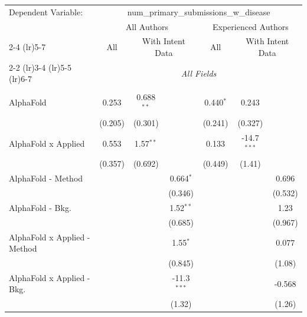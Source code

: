 \begingroup
\centering
\begin{tabular}{lcccccc}
   \tabularnewline \midrule \midrule
   Dependent Variable: & \multicolumn{6}{c}{num\_primary\_submissions\_w\_disease}\\
 & \multicolumn{3}{c}{All Authors} & \multicolumn{3}{c}{Experienced Authors} \\
\cmidrule(lr){2-4} \cmidrule(lr){5-7}
 & \multicolumn{1}{c}{All} & \multicolumn{2}{c}{With Intent Data} & \multicolumn{1}{c}{All} & \multicolumn{2}{c}{With Intent Data} \\
\cmidrule(lr){2-2} \cmidrule(lr){3-4} \cmidrule(lr){5-5} \cmidrule(lr){6-7}
 & \multicolumn{6}{c}{\textit{All Fields}} \\ \\
   AlphaFold                      & 0.253   & 0.688$^{**}$ &               & 0.440$^{*}$ & 0.243         &   \\   
                                  & (0.205) & (0.301)      &               & (0.241)     & (0.327)       &   \\   
   AlphaFold x Applied            & 0.553   & 1.57$^{**}$  &               & 0.133       & -14.7$^{***}$ &   \\   
                                  & (0.357) & (0.692)      &               & (0.449)     & (1.41)        &   \\   
   AlphaFold - Method             &         &              & 0.664$^{*}$   &             &               & 0.696\\   
                                  &         &              & (0.346)       &             &               & (0.532)\\   
   AlphaFold - Bkg.               &         &              & 1.52$^{**}$   &             &               & 1.23\\   
                                  &         &              & (0.685)       &             &               & (0.967)\\   
   AlphaFold x Applied - Method   &         &              & 1.55$^{*}$    &             &               & 0.077\\   
                                  &         &              & (0.845)       &             &               & (1.08)\\   
   AlphaFold x Applied - Bkg.     &         &              & -11.3$^{***}$ &             &               & -0.568\\   
                                  &         &              & (1.32)        &             &               & (1.26)\\   

\end{tabular}
